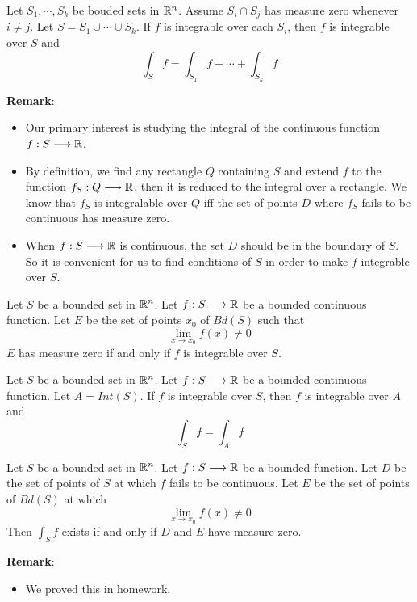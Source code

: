 \begin{corollary}
    Let $S_1,\cdots,S_k$ be bouded sets in $\mathbb{R}^n$. Assume $S_i\cap S_j$ has measure zero whenever $i\neq j$. Let $S=S_1\cup\cdots\cup S_k$. If $f$ is integrable over each $S_i$, then $f$ is integrable over $S$ and $$\int_Sf=\int_{S_1}f+\cdots+\int_{S_k}f$$
\end{corollary}

\noindent \textbf{Remark}:
\begin{itemize}
    \item Our primary interest is studying the integral of the continuous function $f:S\longrightarrow\mathbb{R}$.
    \item By definition, we find any rectangle $Q$ containing $S$ and extend $f$ to the function $f_S:Q\longrightarrow\mathbb{R}$, then it is reduced to the integral over a rectangle. We know that $f_S$ is integralable over $Q$ iff the set of points $D$ where $f_S$ fails to be continuous has measure zero.
    \item When $f:S\longrightarrow\mathbb{R}$ is continuous, the set $D$ should be in the boundary of $S$. So it is convenient for us to find conditions of $S$ in order to make $f$ integrable over $S$.
\end{itemize}

\begin{theorem}\label{f integrable over S iff E has measure zero}
    Let $S$ be a bounded set in $\mathbb{R}^n$. Let $f:S\longrightarrow\mathbb{R}$ be a bounded continuous function. Let $E$ be the set of points $x_0$ of $Bd(S)$ such that $$\lim_{x\to x_0}f(x)\neq 0$$
    $E$ has measure zero if and only if $f$ is integrable over $S$.
\end{theorem}

\begin{theorem}\label{integral over interior}
    Let $S$ be a bounded set in $\mathbb{R}^n$. Let $f:S\longrightarrow \mathbb{R}$ be a bounded continuous function. Let $A=Int(S)$. If $f$ is integrable over $S$, then $f$ is integrable over $A$ and $$\int_Sf=\int_Af$$
\end{theorem}


\begin{theorem*}
    Let $S$ be a bounded set in $\mathbb{R}^n$. Let $f:S\longrightarrow\mathbb{R}$ be a bounded function. Let $D$ be the set of points of $S$ at which $f$ fails to be continuous. Let $E$ be the set of points of $Bd(S)$ at which $$\lim_{x\to x_0}f(x)\neq0$$
    Then $\int_Sf$ exists if and only if $D$ and $E$ have measure zero.
\end{theorem*}
\noindent \textbf{Remark}:
\begin{itemize}
    \item We proved this in homework.
\end{itemize}

